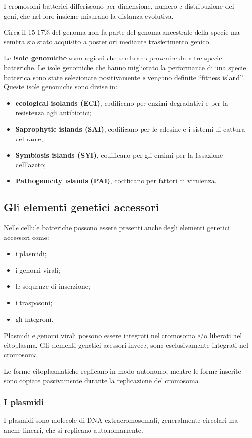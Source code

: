 \documentclass[11pt]{book}
\begin{document}
I cromosomi batterici differiscono per dimensione, numero e distribuzione dei geni, che nel loro insieme misurano la distanza evolutiva.

Circa il 15-17$\%$ del genoma non fa parte del genoma ancestrale della specie ma sembra sia stato acquisito a posteriori mediante trasferimento genico.

\vspace{1em}
Le \textbf{isole genomiche} sono regioni che sembrano provenire da altre specie batteriche. Le isole genomiche che hanno migliorato la performance di una specie batterica sono state selezionate positivamente e vengono definite ``fitness island''.
Queste isole genomiche sono divise in:
\begin{itemize}
\item \textbf{ecological isolands (ECI)}, codificano per enzimi degradativi e per la resistenza agli antibiotici;
\item \textbf{Saprophytic islands (SAI)}, codificano per le adesine e i  sistemi di cattura del rame;
\item \textbf{Symbiosis islands (SYI)}, codificano per gli enzimi per la fissazione dell’azoto;
\item \textbf{Pathogenicity islands (PAI)}, codificano per fattori di virulenza.
\end{itemize}

\clearpage
\subsection{Gli elementi genetici accessori}
Nelle cellule batteriche possono essere presenti anche degli elementi genetici accessori come:
\begin{itemize}
\item i plasmidi;
\item i genomi virali; 
\item le sequenze di inserzione;
\item i trasposoni; 
\item gli integroni.
\end{itemize}

Plasmidi e genomi virali possono essere integrati nel cromosoma e/o liberati nel citoplasma.
Gli elementi genetici acessori invece, sono esclusivamente integrati nel cromosoma.

Le forme citoplasmatiche replicano in modo autonomo, mentre le forme inserite sono copiate passivamente durante la replicazione del cromosoma.

\subsubsection{I plasmidi} 
I plasmidi sono molecole di DNA extracromosomali, generalmente circolari ma anche lineari, che si replicano autonomamente. 
\end{document}
